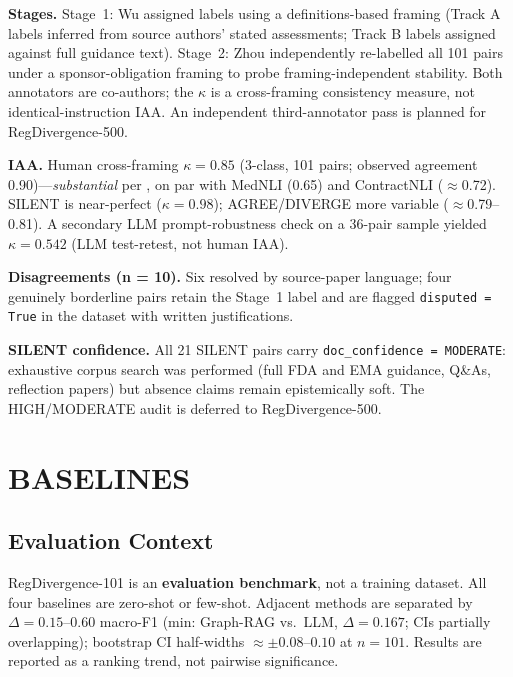 \documentclass[manuscript]{acmart}
\makeatletter
\let\@acmt@@section\section
\renewcommand{\section}[1]{%
  \@acmt@@section{\texorpdfstring{\MakeUppercase{#1}}{#1}}}
\makeatother
\begin{document}
\textbf{Stages.} Stage~1: Wu assigned labels using a definitions-based framing
(Track A labels inferred from source authors' stated assessments; Track B labels
assigned against full guidance text). Stage~2: Zhou independently re-labelled
all 101 pairs under a sponsor-obligation framing to probe framing-independent
stability. Both annotators are co-authors; the $\kappa$ is a cross-framing
consistency measure, not identical-instruction IAA. An independent
third-annotator pass is planned for RegDivergence-500.

\textbf{IAA.} Human cross-framing $\kappa = 0.85$ (3-class, 101 pairs;
observed agreement 0.90)---\textit{substantial} per \citet{landis1977kappa},
on par with MedNLI (0.65) and ContractNLI ($\approx$0.72). SILENT is
near-perfect ($\kappa = 0.98$); AGREE/DIVERGE more variable ($\approx$0.79--0.81).
A secondary LLM prompt-robustness check on a 36-pair sample yielded
$\kappa = 0.542$ (LLM test-retest, not human IAA).

\textbf{Disagreements (n = 10).} Six resolved by source-paper language; four
genuinely borderline pairs retain the Stage~1 label and are flagged
\texttt{disputed = True} in the dataset with written justifications.

\textbf{SILENT confidence.} All 21 SILENT pairs carry
\texttt{doc\_confidence = MODERATE}: exhaustive corpus search was performed
(full FDA and EMA guidance, Q\&As, reflection papers) but absence claims remain
epistemically soft. The HIGH/MODERATE audit is deferred to RegDivergence-500.

\section{Baselines}

\subsection{Evaluation Context}
\label{sec:eval_context}

RegDivergence-101 is an \textbf{evaluation benchmark}, not a training dataset.
All four baselines are zero-shot or few-shot. Adjacent methods are separated by
$\Delta = 0.15$--$0.60$ macro-F1 (min: Graph-RAG vs.\ LLM, $\Delta = 0.167$;
CIs partially overlapping); bootstrap CI half-widths $\approx \pm 0.08$--$0.10$
at $n = 101$. Results are reported as a ranking trend, not pairwise significance.
\end{document}
